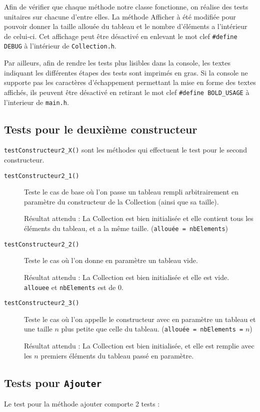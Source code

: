 \documentclass[11pt]{article}
\begin{document}
Afin de vérifier que chaque méthode  notre classe fonctionne, on réalise des tests unitaires sur chacune d'entre elles. La méthode Afficher à été modifiée pour pouvoir donner la taille allouée du tableau et le nombre d'éléments a l'intérieur de celui-ci. Cet affichage peut être désactivé en enlevant le mot clef \texttt{\#define DEBUG} à l'intérieur de \texttt{Collection.h}.

Par ailleurs, afin de rendre les tests plus lisibles dans la console, les textes indiquant les différentes étapes des tests sont imprimés en gras. Si la console ne supporte pas les caractères d'échappement permettant la mise en forme des textes affichés, ils peuvent être désactivé en retirant le mot clef \texttt{\#define~BOLD\_USAGE} à l'interieur de \texttt{main.h}.

\subsection{Tests pour le deuxième constructeur}

\texttt{testConstructeur2\_X()} sont les méthodes qui effectuent le test pour le second constructeur. 
\begin{description}
	\item[\texttt{testConstructeur2\_1()}] Teste le cas de base où l'on passe un tableau rempli arbitrairement en paramètre du constructeur de la Collection (ainsi que sa taille).
	
	Résultat attendu : La Collection est bien initialisée et elle contient tous les éléments du tableau, et a la même taille. ({\tt allouée = nbElements})
	
	\item[\texttt{testConstructeur2\_2()}] Teste le cas où l'on donne en paramètre un tableau vide.
	
	Résultat attendu : La Collection est bien initialisée et elle est vide. \texttt{allouee} et \texttt{nbElements} est de 0. 
	
	\item[\texttt{testConstructeur2\_3()}] Teste le cas où l'on appelle le constructeur avec en paramètre un tableau et une taille $n$ plus petite que celle du tableau. ({\tt allouée = nbElements =} $n$)
	
	Résultat attendu : La Collection est bien initialisée, et elle est remplie avec les $n$ premiers éléments du tableau passé en paramètre.
\end{description}

\subsection{Tests pour \tt Ajouter}
Le test pour la méthode ajouter comporte 2 tests :
\end{document}
